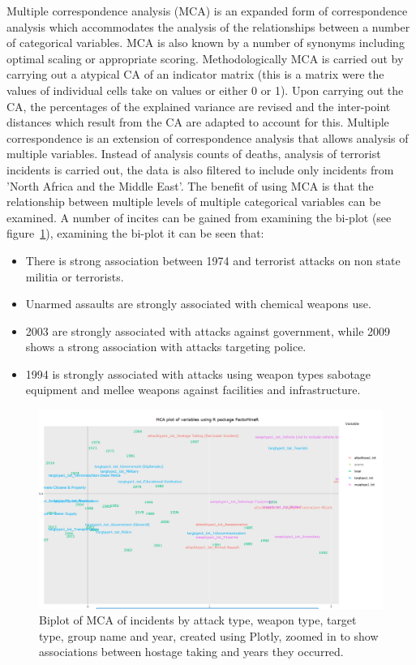Multiple correspondence analysis (MCA) is an expanded form of correspondence analysis which accommodates the analysis of the relationships between a number of categorical variables. MCA is also known by a number of synonyms including  optimal scaling or appropriate scoring. Methodologically MCA is carried out by carrying out a atypical CA of an indicator matrix (this is a matrix were the values of individual cells take on values or either 0 or 1). Upon carrying out the CA, the percentages of the explained variance are revised and the inter-point distances which result from the CA are adapted to account for this. Multiple correspondence is an extension of correspondence analysis that allows analysis of multiple variables. Instead of analysis counts of deaths, analysis of terrorist incidents is carried out, the data is also filtered to include only incidents from 'North Africa and the Middle East'. The benefit of using MCA is that the relationship between multiple levels of multiple categorical variables can be examined. A number of incites can be gained from examining the bi-plot (see figure~\ref{fig:biplotmca}), examining the bi-plot it can be seen that:
\begin{itemize}
\item  There is strong association between 1974 and terrorist attacks on non state militia or terrorists.
\item Unarmed assaults are strongly associated with chemical weapons use.
\item 2003 are strongly associated with attacks against government, while 2009 shows a strong association with attacks targeting police.  
\item 1994 is strongly associated with attacks using weapon types sabotage equipment and mellee weapons against facilities and infrastructure.
\end{itemize}

\begin{figure}[t]
\includegraphics[width=15cm]{Peters_experiment_markdown_files/figure-latex/newplot3.png}
\caption{Biplot of MCA of incidents by attack type, weapon type, target type, group name and year, created using Plotly, zoomed in to show associations between hostage taking and years they occurred.}
\label{fig:biplotmca}
\centering
\end{figure}


